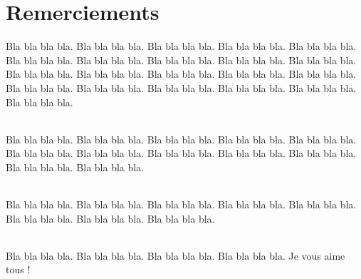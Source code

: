 \chapter*{Remerciements}

Bla bla bla bla. Bla bla bla bla. Bla bla bla bla. Bla bla bla bla. Bla bla bla bla. Bla bla bla bla. Bla bla bla bla. Bla bla bla bla. Bla bla bla bla. Bla bla bla bla. Bla bla bla bla. Bla bla bla bla. Bla bla bla bla. Bla bla bla bla. Bla bla bla bla. Bla bla bla bla. Bla bla bla bla. Bla bla bla bla. Bla bla bla bla. Bla bla bla bla. Bla bla bla bla. 

\subparagraph*{}
Bla bla bla bla. Bla bla bla bla. Bla bla bla bla. Bla bla bla bla. Bla bla bla bla. Bla bla bla bla. Bla bla bla bla. Bla bla bla bla. Bla bla bla bla. Bla bla bla bla. Bla bla bla bla. Bla bla bla bla. 
\subparagraph*{}
Bla bla bla bla. Bla bla bla bla. Bla bla bla bla. Bla bla bla bla. Bla bla bla bla. Bla bla bla bla. Bla bla bla bla. Bla bla bla bla. 
\subparagraph*{}
Bla bla bla bla. Bla bla bla bla. Bla bla bla bla. Bla bla bla bla.  Je vous aime tous !
